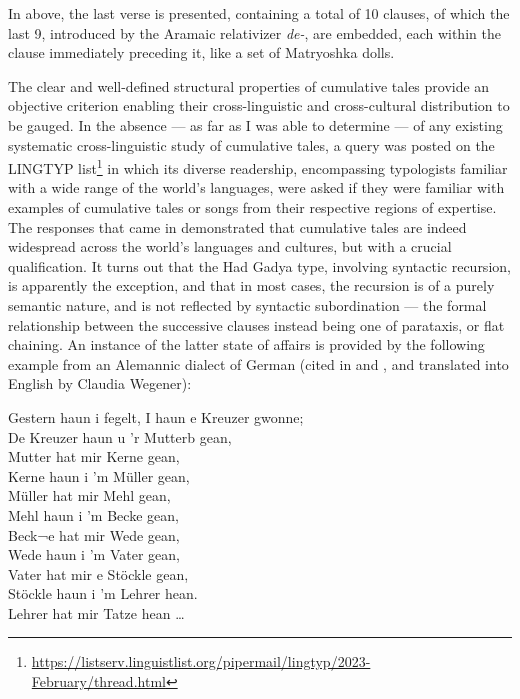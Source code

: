 \documentclass[output=paper,colorlinks,citecolor=brown
]{langscibook}
\begin{document}
\z

In  above, the last verse is presented, containing a total of 10 clauses, of which the last 9, introduced by the Aramaic relativizer \textit{de-}, are embedded, each within the clause immediately preceding it, like a set of Matryoshka dolls.  

The clear and well-defined structural properties of cumulative tales provide an objective criterion enabling their cross-linguistic and cross-cultural distribution to be gauged.  In the absence — as far as I was able to determine — of any existing systematic cross-linguistic study of cumulative tales, a query was posted on the LINGTYP list\footnote{\url{https://listserv.linguistlist.org/pipermail/lingtyp/2023-February/thread.html}} in which its diverse readership, encompassing typologists familiar with a wide range of the world's languages, were asked if they were familiar with examples of cumulative  tales or songs from their respective regions of expertise.  The responses that came in demonstrated that cumulative tales are indeed widespread across the world's languages and cultures, but with a crucial qualification.  It turns out that the Had Gadya type, involving syntactic recursion, is apparently the exception, and that in most cases, the recursion is of a purely semantic nature, and is not reflected by syntactic subordination — the formal relationship between the successive clauses instead being one of parataxis, or flat chaining.  An instance of the latter state of affairs is provided by the following example from an Alemannic dialect of German (cited in 
\cite[65]{meier1851deutsche} and \cite[39]{newell1905passover}, and translated into English by Claudia Wegener):

\ea \label{ex:gil:11}

Gestern haun i fegelt, I haun e Kreuzer gwonne;\\
De Kreuzer haun u 'r Mutterb gean,\\
Mutter hat mir Kerne gean,\\
Kerne haun i 'm Müller gean,\\
Müller hat mir Mehl gean,\\
Mehl haun i 'm Becke gean,\\
Beck¬e hat mir Wede gean,\\
Wede haun i 'm Vater gean,\\
Vater hat mir e Stöckle gean,\\
Stöckle haun i 'm Lehrer hean.\\
Lehrer hat mir Tatze hean  \ldots \\
 
\end{document}
